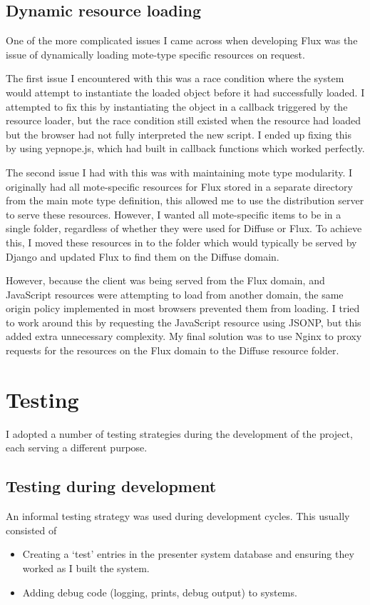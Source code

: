 \documentclass[a4papert,11pt,notitlepage]{ltxdoc}
\begin{document}
 \subsection{Dynamic resource loading}
One of the more complicated issues I came across when developing Flux was the issue of dynamically loading mote-type specific resources on request. 

The first issue I encountered with this was a race condition where the system would attempt to instantiate the loaded object before it had successfully loaded. I attempted to fix this by instantiating the object in a callback triggered by the resource loader, but the race condition still existed when the resource had loaded but the browser had not fully interpreted the new script. I ended up fixing this by using yepnope.js, which had built in callback functions which worked perfectly.

The second issue I had with this was with maintaining mote type modularity. I originally had all mote-specific resources for Flux stored in a separate directory from the main mote type definition, this allowed me to use the distribution server to serve these resources. However, I wanted all mote-specific items to be in a single folder, regardless of whether they were used for Diffuse or Flux. To achieve this, I moved these resources in to the folder which would typically be served by Django and updated Flux to find them on the Diffuse domain. 

However, because the client was being served from the Flux domain, and JavaScript resources were attempting to load from another domain, the same origin policy implemented in most browsers prevented them from loading. I tried to work around this by requesting the JavaScript resource using JSONP, but this added extra unnecessary complexity. My final solution was to use Nginx to proxy requests for the resources on the Flux domain to the Diffuse resource folder.


\pagebreak
\section{Testing}
I adopted a number of testing strategies during the development of the project, each serving a different purpose.

\subsection{Testing during development}
An informal testing strategy was used during development cycles. This usually consisted of
\begin{itemize}
\item Creating a `test' entries in the presenter system database and ensuring they worked as I built the system. 
\item Adding debug code (logging, prints, debug output) to systems.
\end{itemize}
\end{document}
